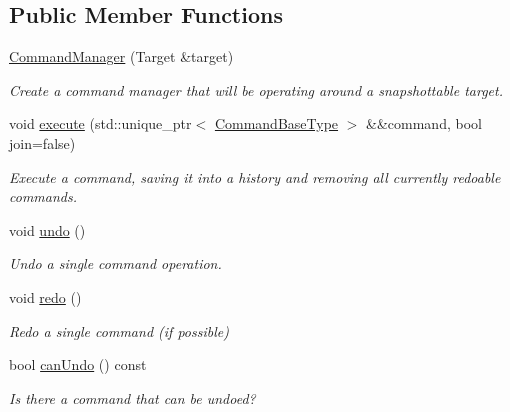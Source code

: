 \subsection*{Public Member Functions}
\begin{DoxyCompactItemize}
\item 
\mbox{\label{classpepr3d_1_1_command_manager_aa4545583769603c741a2dab3e876a5fb}} 
\mbox{\hyperlink{classpepr3d_1_1_command_manager_aa4545583769603c741a2dab3e876a5fb}{Command\+Manager}} (Target \&target)
\begin{DoxyCompactList}\small\item\em Create a command manager that will be operating around a snapshottable target. \end{DoxyCompactList}\item 
void \mbox{\hyperlink{classpepr3d_1_1_command_manager_a0aae9681640f09da9c908154b805273e}{execute}} (std\+::unique\+\_\+ptr$<$ \mbox{\hyperlink{classpepr3d_1_1_command_base}{Command\+Base\+Type}} $>$ \&\&command, bool join=false)
\begin{DoxyCompactList}\small\item\em Execute a command, saving it into a history and removing all currently redoable commands. \end{DoxyCompactList}\item 
\mbox{\label{classpepr3d_1_1_command_manager_af71406e4f6aee85b1cb9fe02b9a8b13e}} 
void \mbox{\hyperlink{classpepr3d_1_1_command_manager_af71406e4f6aee85b1cb9fe02b9a8b13e}{undo}} ()
\begin{DoxyCompactList}\small\item\em Undo a single command operation. \end{DoxyCompactList}\item 
\mbox{\label{classpepr3d_1_1_command_manager_acb90e67e6e97c0d143ddb9e67ccbebb2}} 
void \mbox{\hyperlink{classpepr3d_1_1_command_manager_acb90e67e6e97c0d143ddb9e67ccbebb2}{redo}} ()
\begin{DoxyCompactList}\small\item\em Redo a single command (if possible) \end{DoxyCompactList}\item 
bool \mbox{\hyperlink{classpepr3d_1_1_command_manager_a2d53a763697329e206e72ddeef1ce75b}{can\+Undo}} () const
\begin{DoxyCompactList}\small\item\em Is there a command that can be undoed? \end{DoxyCompactList}\item 

\end{DoxyCompactItemize}
